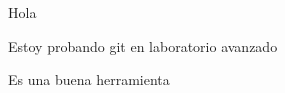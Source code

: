 \documentclass{article}
\begin{document}
Hola

Estoy probando git en laboratorio avanzado

Es una buena herramienta
\end{document}
